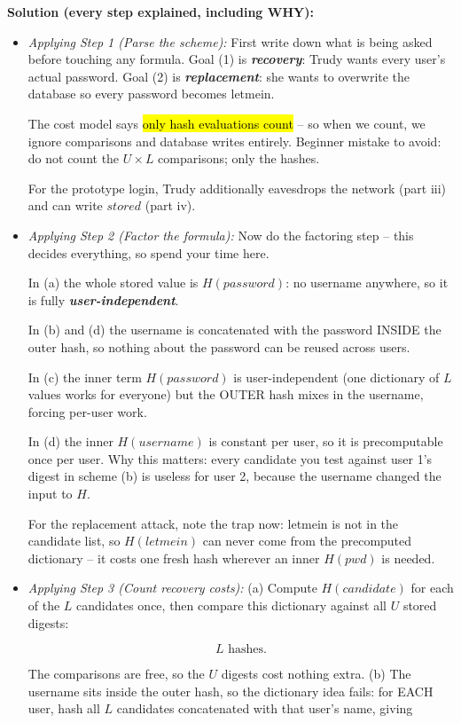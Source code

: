 \documentclass[12pt, a4paper]{article}
\newcommand{\term}[1]{\textbf{\textit{#1}}}        %
\newcommand{\imp}[1]{\hl{#1}}                       %
\begin{document}
\textbf{Solution (every step explained, including WHY):}
\begin{itemize}
    \item \textit{Applying Step 1 (Parse the scheme):} First write down what is being asked before touching any formula. Goal (1) is \term{recovery}: Trudy wants every user's actual password. Goal (2) is \term{replacement}: she wants to overwrite the database so every password becomes letmein.

    The cost model says \imp{only hash evaluations count} -- so when we count, we ignore comparisons and database writes entirely. Beginner mistake to avoid: do not count the $U \times L$ comparisons; only the hashes.

    For the prototype login, Trudy additionally eavesdrops the network (part iii) and can write $stored$ (part iv).
    \item \textit{Applying Step 2 (Factor the formula):} Now do the factoring step -- this decides everything, so spend your time here.

    In (a) the whole stored value is $H(password)$: no username anywhere, so it is fully \term{user-independent}.

    In (b) and (d) the username is concatenated with the password INSIDE the outer hash, so nothing about the password can be reused across users.

    In (c) the inner term $H(password)$ is user-independent (one dictionary of $L$ values works for everyone) but the OUTER hash mixes in the username, forcing per-user work.

    In (d) the inner $H(username)$ is constant per user, so it is precomputable once per user. Why this matters: every candidate you test against user 1's digest in scheme (b) is useless for user 2, because the username changed the input to $H$.

    For the replacement attack, note the trap now: letmein is not in the candidate list, so $H(letmein)$ can never come from the precomputed dictionary -- it costs one fresh hash wherever an inner $H(pwd)$ is needed.
    \item \textit{Applying Step 3 (Count recovery costs):} (a) Compute $H(candidate)$ for each of the $L$ candidates once, then compare this dictionary against all $U$ stored digests:

\[
L \text{ hashes.}
\]

The comparisons are free, so the $U$ digests cost nothing extra. (b) The username sits inside the outer hash, so the dictionary idea fails: for EACH user, hash all $L$ candidates concatenated with that user's name, giving


\end{itemize}
\end{document}
